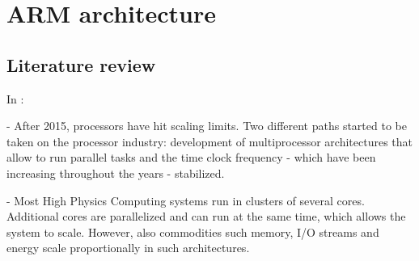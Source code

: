 \section{ARM architecture}
\subsection{Literature review}


In \cite{ACAT13ARM}:

- After 2015, processors have hit scaling limits. Two different paths started to be
taken on the processor industry:  development of multiprocessor architectures that
allow to run parallel tasks and the time clock frequency - which have been
increasing throughout the years - stabilized.

- Most High Physics Computing systems run in clusters of several cores.
Additional cores are parallelized and can run at the same time, which allows the
system to scale. However, also commodities such memory, I/O streams and energy
scale proportionally in such architectures.
 
 
